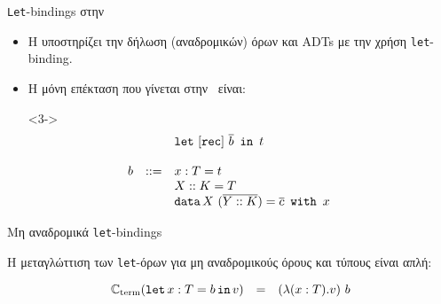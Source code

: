 \documentclass[10pt]{beamer}
\begin{document}
\begin{frame}{\texttt{Let}-bindings στην \FIR{} }

\begin{itemize}
    \item <1->Η \FIR{} υποστηρίζει την δήλωση (αναδρομικών) όρων και ADTs με την χρήση
\texttt{let}-binding.
    \item <2->Η μόνη επέκταση που γίνεται στην \FOMF ~είναι:

\item[]<3->{
  \begin{displaymath}
  \begin{array}{lllll}
                  &   & \tlet ~ [\rec] ~ \seq{b} ~ \tin ~ t & &\\
                      &        &     &                             &   \\
     b      & ::= & x : T = t     &   & \\
                              &     & X :: K = T      & &\\
                            &     & \datatype{X}{(\seq{Y :: K})}{x}{\seq{c}} &   &\\
 \end{array}
  \end{displaymath}
}
\item[] 
\end{itemize}

\end{frame}



\begin{frame}[fragile]{Μη αναδρομικά \texttt{let}-bindings }

Η μεταγλώττιση των \texttt{let}-όρων για μη αναδρομικούς όρους και τύπους
είναι απλή:

\begin{displaymath}
    \begin{array}{lll}
    \compileterm(\tlet x : T = b \tin v) &=& (\lambda (x : T) . v)\ b\\
    \\
    \end{array}
\end{displaymath}

\end{frame}
\end{document}
